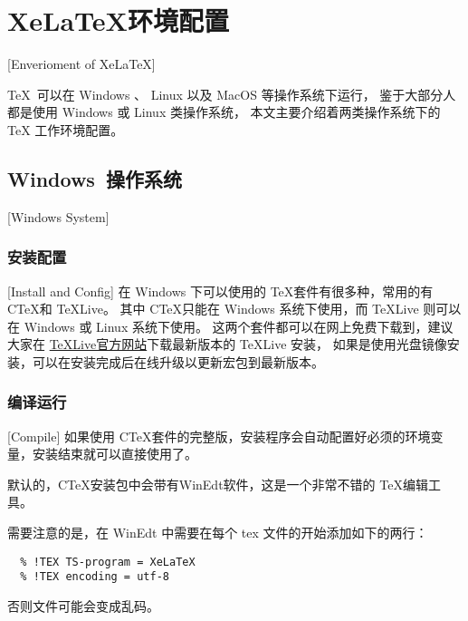 
%
%
%

\chapter{XeLaTeX环境配置}[Enverioment of XeLaTeX]
\label{chap02}

\TeX{}~可以在 Windows 、 Linux 以及 MacOS 等操作系统下运行，
鉴于大部分人都是使用 Windows 或 Linux 类操作系统，
本文主要介绍着两类操作系统下的 \TeX{} 工作环境配置。

\section{Windows~操作系统}[Windows System]

\subsection{安装配置}[Install and Config]
在 Windows 下可以使用的 \TeX{}套件有很多种，常用的有 C\TeX{}和 \TeX{}Live。
其中 C\TeX{}只能在 Windows 系统下使用，而 \TeX{}Live 则可以在 Windows 或 Linux 系统下使用。
这两个套件都可以在网上免费下载到，建议大家在 \href{https://tug.org/texlive/}{\TeX{}Live官方网站}下载最新版本的 \TeX{}Live 安装，
如果是使用光盘镜像安装，可以在安装完成后在线升级以更新宏包到最新版本。

\subsection{编译运行}[Compile]
如果使用 C\TeX{}套件的完整版，安装程序会自动配置好必须的环境变量，安装结束就可以直接使用了。

默认的，C\TeX{}安装包中会带有WinEdt软件，这是一个非常不错的 \TeX{}编辑工具。

需要注意的是，在 WinEdt 中需要在每个 tex 文件的开始添加如下的两行：
\begin{lstlisting}
  % !TEX TS-program = XeLaTeX
  % !TEX encoding = utf-8
\end{lstlisting}
否则文件可能会变成乱码。

